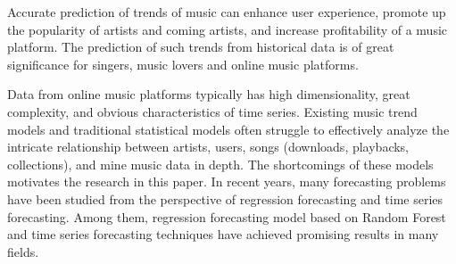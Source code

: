 \begin{eabstract}
   Accurate prediction of trends of music can enhance user experience, promote up the popularity of artists and coming artists, and increase profitability of a music platform. The prediction of such trends from historical data is of great significance for singers, music lovers and online music platforms. 

   Data from online music platforms typically has high dimensionality, great complexity, and obvious characteristics of time series. Existing music trend models and traditional statistical models often struggle to effectively analyze the intricate relationship between artists, users, songs (downloads, playbacks, collections), and mine music data in depth. The shortcomings of these models motivates the research in this paper. In recent years, many forecasting problems have been studied from the perspective of regression forecasting and time series forecasting. Among them, regression forecasting model based on Random Forest and time series forecasting techniques have achieved promising results in many fields.


\end{eabstract}
